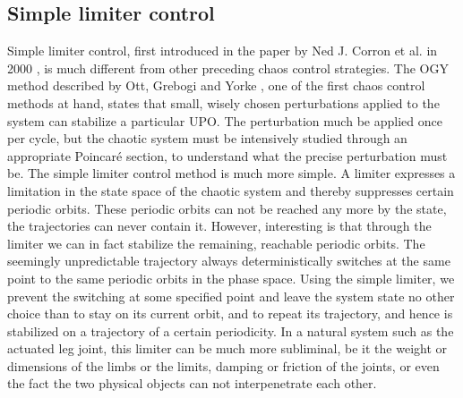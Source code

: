 \documentclass[main]{subfiles}
\begin{document}
\subsection{Simple limiter control}

Simple limiter control, first introduced in the paper by Ned J. Corron et al. in 2000 \cite{bib:Corron2000}, is much different from other preceding chaos control strategies. The OGY method described by Ott, Grebogi and Yorke \cite{bib:Ott1990}, one of the first chaos control methods at hand, states that small, wisely chosen perturbations applied to the system can stabilize a particular UPO. The perturbation much be applied once per cycle, but the chaotic system must be intensively studied through an appropriate Poincaré section, to understand what the precise perturbation must be. The simple limiter control method is much more simple. A limiter expresses a limitation in the state space of the chaotic system and thereby suppresses certain periodic orbits. These periodic orbits can not be reached any more by the state, the trajectories can never contain it. However, interesting is that through the limiter we can in fact stabilize the remaining, reachable periodic orbits. The seemingly unpredictable trajectory always deterministically switches at the same point to the same periodic orbits in the phase space. Using the simple limiter, we prevent the switching at some specified point and leave the system state no other choice than to stay on its current orbit, and to repeat its trajectory, and hence is stabilized on a trajectory of a certain periodicity. In a natural system such as the actuated leg joint, this limiter can be much more subliminal, be it the weight or dimensions of the limbs or the limits, damping or friction of the joints, or even the fact the two physical objects can not interpenetrate each other.
\end{document}
